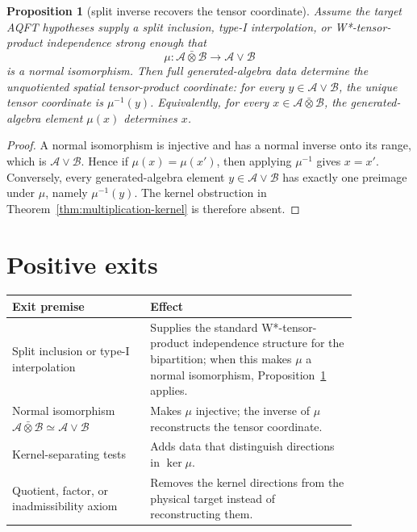\documentclass[12pt]{article}
\newtheorem{proposition}{Proposition}
\theoremstyle{remark}
\newcommand{\A}{\mathcal A}
\newcommand{\B}{\mathcal B}
\newcommand{\barotimes}{\mathbin{\bar\otimes}}
\begin{document}
\begin{proposition}[split inverse recovers the tensor coordinate]
\label{prop:split-inverse}
Assume the target AQFT hypotheses supply a split inclusion, type-I
interpolation, or W*-tensor-product independence strong enough that
\[
  \mu:\A\barotimes\B\longrightarrow\A\vee\B
\]
is a normal isomorphism.  Then full generated-algebra data determine the
unquotiented spatial tensor-product coordinate: for every \(y\in\A\vee\B\), the
unique tensor coordinate is \(\mu^{-1}(y)\).  Equivalently, for every
\(x\in\A\barotimes\B\), the generated-algebra element \(\mu(x)\) determines
\(x\).
\end{proposition}

\begin{proof}
A normal isomorphism is injective and has a normal inverse onto its range,
which is \(\A\vee\B\).  Hence if \(\mu(x)=\mu(x')\), then applying \(\mu^{-1}\)
gives \(x=x'\).  Conversely, every generated-algebra element \(y\in\A\vee\B\)
has exactly one preimage under \(\mu\), namely \(\mu^{-1}(y)\).  The kernel
obstruction in Theorem~\ref{thm:multiplication-kernel} is therefore absent.
\end{proof}

\section{Positive exits}

\begin{center}
\begin{tabular}{p{0.34\linewidth}p{0.51\linewidth}}
\toprule
Exit premise & Effect \\
\midrule
Split inclusion or type-I interpolation & Supplies the standard
W*-tensor-product independence structure for the bipartition; when this makes
\(\mu\) a normal isomorphism, Proposition~\ref{prop:split-inverse} applies. \\
\addlinespace
Normal isomorphism \(\A\barotimes\B\simeq\A\vee\B\) & Makes \(\mu\) injective;
the inverse of \(\mu\) reconstructs the tensor coordinate. \\
\addlinespace
Kernel-separating tests & Adds data that distinguish directions in
\(\ker\mu\). \\
\addlinespace
Quotient, factor, or inadmissibility axiom & Removes the kernel directions
from the physical target instead of reconstructing them. \\
\bottomrule
\end{tabular}
\end{center}
\end{document}

